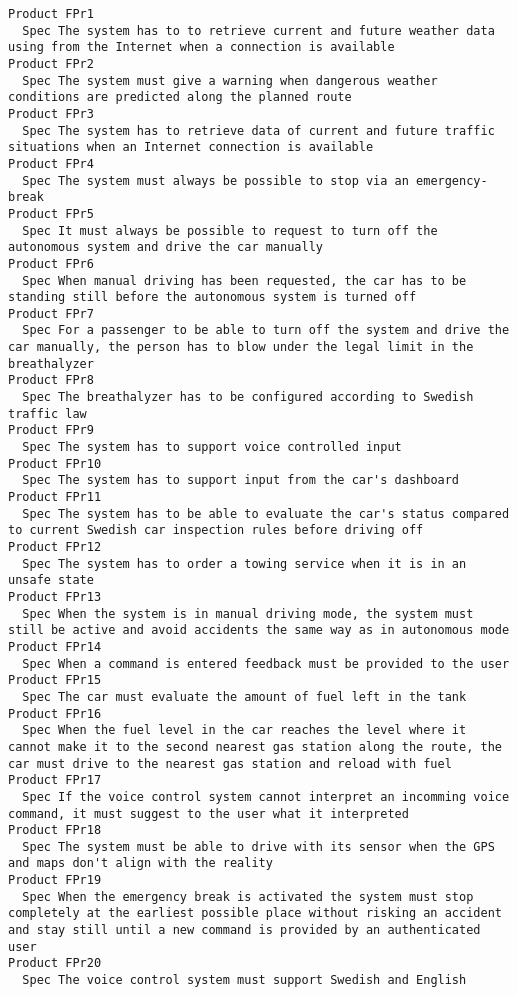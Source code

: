 \begin{lstlisting}
Product FPr1
  Spec The system has to to retrieve current and future weather data using from the Internet when a connection is available
Product FPr2
  Spec The system must give a warning when dangerous weather conditions are predicted along the planned route
Product FPr3
  Spec The system has to retrieve data of current and future traffic situations when an Internet connection is available
Product FPr4
  Spec The system must always be possible to stop via an emergency-break
Product FPr5
  Spec It must always be possible to request to turn off the autonomous system and drive the car manually
Product FPr6
  Spec When manual driving has been requested, the car has to be standing still before the autonomous system is turned off
Product FPr7
  Spec For a passenger to be able to turn off the system and drive the car manually, the person has to blow under the legal limit in the breathalyzer
Product FPr8
  Spec The breathalyzer has to be configured according to Swedish traffic law
Product FPr9
  Spec The system has to support voice controlled input
Product FPr10
  Spec The system has to support input from the car's dashboard
Product FPr11
  Spec The system has to be able to evaluate the car's status compared to current Swedish car inspection rules before driving off
Product FPr12
  Spec The system has to order a towing service when it is in an unsafe state
Product FPr13
  Spec When the system is in manual driving mode, the system must still be active and avoid accidents the same way as in autonomous mode
Product FPr14
  Spec When a command is entered feedback must be provided to the user
Product FPr15
  Spec The car must evaluate the amount of fuel left in the tank
Product FPr16
  Spec When the fuel level in the car reaches the level where it cannot make it to the second nearest gas station along the route, the car must drive to the nearest gas station and reload with fuel
Product FPr17
  Spec If the voice control system cannot interpret an incomming voice command, it must suggest to the user what it interpreted
Product FPr18
  Spec The system must be able to drive with its sensor when the GPS and maps don't align with the reality
Product FPr19
  Spec When the emergency break is activated the system must stop completely at the earliest possible place without risking an accident and stay still until a new command is provided by an authenticated user
Product FPr20
  Spec The voice control system must support Swedish and English

\end{lstlisting}
    
